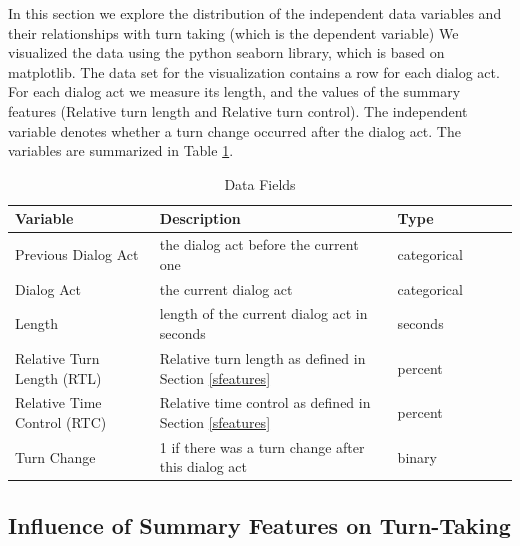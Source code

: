 In this section we explore the distribution of the independent data variables and their relationships with turn taking (which is the dependent variable)
%
We visualized the data using the python seaborn library, which is based on matplotlib. The data set for the visualization contains a row for each dialog act. For each dialog act we measure its length, and the values of the summary features (Relative turn length and Relative turn control). The independent variable denotes whether a turn change occurred after the dialog act.  The variables are summarized in Table \ref {tab:vars}.

\begin{table}[ht!]
\begin{center}
\begin{tabular}{llllrr}
\toprule
Variable &  Description & Type &\\
\midrule
     Previous Dialog Act & the dialog act before the current one  & categorical\\
     Dialog Act & the current dialog act & categorical \\
     Length & length of the current dialog act in seconds & seconds \\
     Relative Turn Length (RTL)  & Relative turn length as defined in Section \ref{sfeatures} & percent \\
     Relative Time Control (RTC) & Relative time control as defined in Section \ref{sfeatures} & percent \\
     Turn Change & 1 if there was a turn change after this dialog act & binary \\
\bottomrule
\end{tabular}
\end{center}
\caption{Data Fields}
\label{tab:vars}
\end{table}


\subsection{Influence of Summary Features on Turn-Taking}

